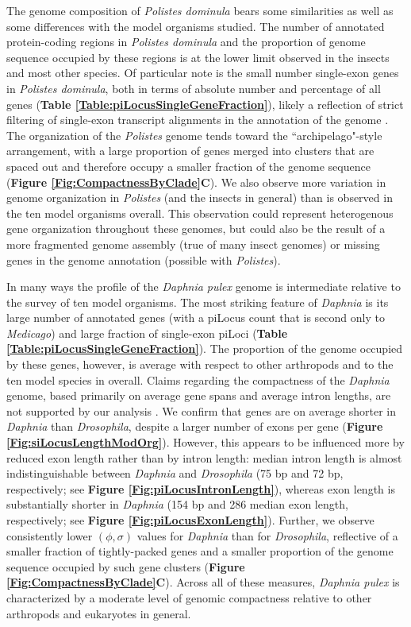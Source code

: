 The genome composition of \textit{Polistes dominula} bears some similarities as well as some differences with the model organisms studied.
The number of annotated protein-coding regions in \textit{Polistes dominula} and the proportion of genome sequence occupied by these regions is at the lower limit observed in the insects and most other species.
Of particular note is the small number single-exon genes in \textit{Polistes dominula}, both in terms of absolute number and percentage of all genes (\textbf{Table \ref{Table:piLocusSingleGeneFraction}}), likely a reflection of strict filtering of single-exon transcript alignments in the annotation of the genome \cite{PdomGenome}.
The organization of the \textit{Polistes} genome tends toward the ``archipelago"-style arrangement, with a large proportion of genes merged into clusters that are spaced out and therefore occupy a smaller fraction of the genome sequence (\textbf{Figure \ref{Fig:CompactnessByClade}C}).
We also observe more variation in genome organization in \textit{Polistes} (and the insects in general) than is observed in the ten model organisms overall.
This observation could represent heterogenous gene organization throughout these genomes, but could also be the result of a more fragmented genome assembly (true of many insect genomes) or missing genes in the genome annotation (possible with \textit{Polistes}).

In many ways the profile of the \textit{Daphnia pulex} genome is intermediate relative to the survey of ten model organisms.
The most striking feature of \textit{Daphnia} is its large number of annotated genes (with a piLocus count that is second only to \textit{Medicago}) and large fraction of single-exon piLoci (\textbf{Table \ref{Table:piLocusSingleGeneFraction}}).
The proportion of the genome occupied by these genes, however, is average with respect to other arthropods and to the ten model species in overall.
Claims regarding the compactness of the \textit{Daphnia} genome, based primarily on average gene spans and average intron lengths, are not supported by our analysis \cite{DaphniaGenome}.
We confirm that genes are on average shorter in \textit{Daphnia} than \textit{Drosophila}, despite a larger number of exons per gene (\textbf{Figure \ref{Fig:siLocusLengthModOrg}}).
However, this appears to be influenced more by reduced exon length rather than by intron length: median intron length is almost indistinguishable between \textit{Daphnia} and \textit{Drosophila} (75 bp and 72 bp, respectively; see \textbf{Figure \ref{Fig:piLocusIntronLength}}), whereas exon length is substantially shorter in \textit{Daphnia} (154 bp and 286 median exon length, respectively; see \textbf{Figure \ref{Fig:piLocusExonLength}}).
Further, we observe consistently lower $(\phi, \sigma)$ values for \textit{Daphnia} than for \textit{Drosophila}, reflective of a smaller fraction of tightly-packed genes and a smaller proportion of the genome sequence occupied by such gene clusters (\textbf{Figure \ref{Fig:CompactnessByClade}C}).
Across all of these measures, \textit{Daphnia pulex} is characterized by a moderate level of genomic compactness relative to other arthropods and eukaryotes in general.


